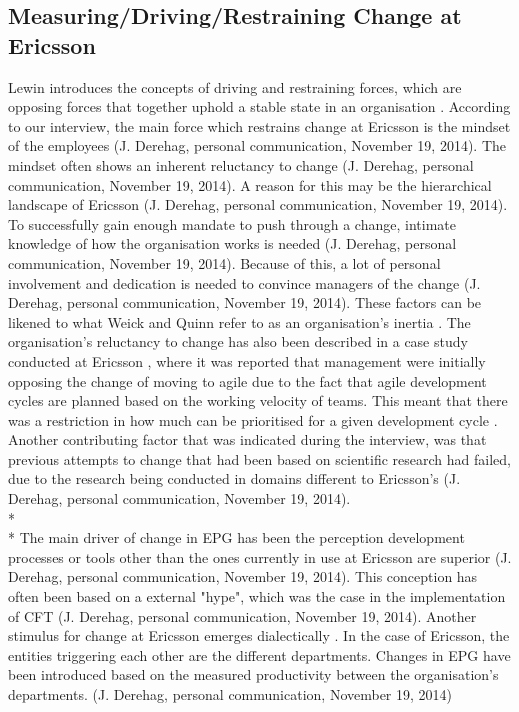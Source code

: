 \documentclass[final_report_innit.tex]{subfiles}
\begin{document}
\subsection{Measuring/Driving/Restraining Change at Ericsson}
Lewin introduces the concepts of driving and restraining forces, which are opposing forces that together uphold a stable state in an organisation \cite{burnes2004kurt}. According to our interview, the main force which restrains change at Ericsson is the mindset of the employees (J. Derehag, personal communication, November 19, 2014). The mindset often shows an inherent reluctancy to change (J. Derehag, personal communication, November 19, 2014). A reason for this may be the hierarchical landscape of Ericsson (J. Derehag, personal communication, November 19, 2014). To successfully gain enough mandate to push through a change, intimate knowledge of how the organisation works is needed (J. Derehag, personal communication, November 19, 2014). Because of this, a lot of personal involvement and dedication is needed to convince managers of the change (J. Derehag, personal communication, November 19, 2014). These factors can be likened to what Weick and Quinn refer to as an organisation's inertia \cite{weick1999organizational}. The organisation's reluctancy to change has also been described in a case study conducted at Ericsson \cite{karlstrom2005combining}, where it was reported that management were initially opposing the change of moving to agile due to the fact that agile development cycles are planned based on the working velocity of teams. This meant that there was a restriction in how much can be prioritised for a given development cycle \cite{karlstrom2005combining}. Another contributing factor that was indicated during the interview, was that previous attempts to change that had been based on scientific research had failed, due to the research being conducted in domains different to Ericsson's (J. Derehag, personal communication, November 19, 2014). 
\\* 
\\* 
The main driver of change in EPG has been the perception development processes or tools other than the ones currently in use at Ericsson are superior (J. Derehag, personal communication, November 19, 2014). This conception has often been based on a external "hype", which was the case in the implementation of CFT (J. Derehag, personal communication, November 19, 2014). Another stimulus for change at Ericsson emerges dialectically \cite{van1995explaining}. In the case of Ericsson, the entities triggering each other are the different departments. Changes in EPG have been introduced based on the measured productivity between the organisation's departments. (J. Derehag, personal communication, November 19, 2014)
\end{document}
